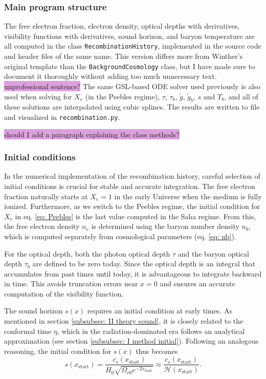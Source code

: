 \documentclass{aa}
\numberwithin{equation}{section}
\numberwithin{table}{section}
\numberwithin{figure}{section}
\begin{document}
\subsubsection{Main program structure}
The free electron fraction, electron density, optical depths with derivatives, visibility functions with derivatives, sound horizon, and baryon temperature are all computed in the class \verb|RecombinationHistory|, implemented in the source code and header files of the same name. This version differs more from Winther's original template than the \verb|BackgroundCosmology| class, but I have made sure to document it thoroughly without adding too much unnecessary text. \colorbox{Plum}{unprofessional sentence?} The same GSL-based ODE solver used previously is also used when solving for $X_e$ (in the Peebles regime), $\tau$, $\tau_b$, $\tilde{g}$, $\tilde{g}_b$, $s$ and $T_b$, and all of these solutions are interpolated using cubic splines. The results are written to file and visualized in \verb|recombination.py|. 

\colorbox{Plum}{should I add a paragraph explaining the class methods?}


\subsubsection{Initial conditions}
In the numerical implementation of the recombination history, careful selection of initial conditions is crucial for stable and accurate integration. The free electron fraction naturally starts at $X_e = 1$ in the early Universe when the medium is fully ionized. Furthermore, as we switch to the Peebles regime, the initial condition for $X_e$ in eq. \eqref{eq: Peebles} is the last value computed in the Saha regime. From this, the free electron density $n_e$ is determined using the baryon number density $n_b$, which is computed separately from cosmological parameters (eq. \eqref{eq: nb}). 

For the optical depth, both the photon optical depth $\tau$ and the baryon optical depth $\tau_b$ are defined to be zero today. Since the optical depth is an integral that accumulates from past times until today, it is advantageous to integrate backward in time. This avoids truncation errors near $x = 0$ and ensures an accurate computation of the visibility function.

The sound horizon $s(x)$ requires an initial condition at early times. As mentioned in section \ref{subsubsec: II theory sound}, it is closely related to the conformal time $\eta$, which in the radiation-dominated era follows an analytical approximation (see section \ref{subsubsec: I method initial}). Following an analogous reasoning, the initial condition for $s(x)$ thus becomes
\begin{equation}
  s(x_\text{start}) = \frac{c_s(x_\text{start})}{H_0\sqrt{\Omega_{r0}e^{-2x_\text{start}}}} \approx \frac{c_s(x_\text{start})}{\mathcal{H}(x_{\text{start}})}.
\end{equation}
\end{document}
